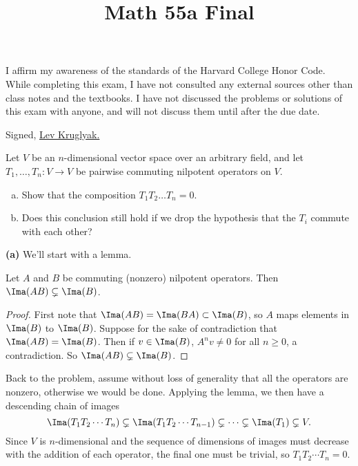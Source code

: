 \documentclass[11pt, letterpaper]{article}
\title{\textbf{Math 55a Final}}
\begin{document}
\maketitle
\setcounter{page}{0}
\thispagestyle{empty}

I affirm my awareness of the standards of the Harvard College Honor
Code. While completing this exam, I have not consulted any external sources other than class notes
and the textbooks. I have not discussed the problems or solutions of this
exam with anyone, and will not discuss them until after the due date.

Signed, \underline{Lev Kruglyak.}

\pagebreak
\begin{problem}
    Let $V$ be an $n$-dimensional vector space over an arbitrary field, and let $T_1,\dots,T_n:V\to V$ be pairwise commuting nilpotent operators on $V$.
    \begin{enumerate}[(a)]
        \item Show that the composition $T_1T_2\dots T_n=0$.
        \item Does this conclusion still hold if we drop the hypothesis that the $T_i$ commute with each other?
    \end{enumerate}
\end{problem}
   
\textbf{(a)} We'll start with a lemma.

\begin{lemma}
    Let $A$ and $B$ be commuting (nonzero) nilpotent operators. Then $\Ima(AB)\subsetneq \Ima(B)$.
\end{lemma}
\begin{proof}
    First note that $\Ima(AB)=\Ima(BA)\subset \Ima(B)$, so $A$ maps elements in $\Ima(B)$ to $\Ima(B)$. Suppose for the sake of contradiction that $\Ima(AB)=\Ima(B)$. Then if $v\in \Ima(B)$, $A^nv\neq 0$ for all $n\geq 0$, a contradiction. So $\Ima(AB)\subsetneq \Ima(B)$.
\end{proof}

Back to the problem, assume without loss of generality that all the operators are nonzero, otherwise we would be done. Applying the lemma, we then have a descending chain of images
\[
    \Ima(T_1T_2\cdots T_n) \subsetneq \Ima(T_1T_2\cdots T_{n-1}) \subsetneq \cdots \subsetneq \Ima(T_1) \subsetneq V
.\] 
Since $V$ is $n$-dimensional and the sequence of dimensions of images must decrease with the addition of each operator, the final one must be trivial, so $T_1T_2\cdots T_n=0$.
\end{document}
